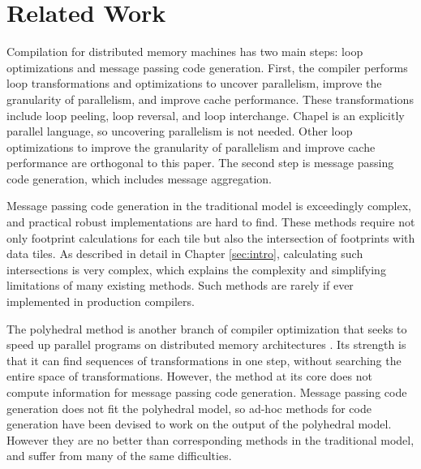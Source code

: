 
\renewcommand{\thechapter}{3}

\chapter{Related Work}\label{sec:relwork}


Compilation for distributed memory machines has two main steps: loop optimizations and message passing code generation. First, the compiler performs loop transformations and optimizations to uncover parallelism, improve the granularity of parallelism, and improve cache performance. These transformations include loop peeling, loop reversal, and loop interchange. Chapel is an explicitly parallel language, so uncovering parallelism is not needed. Other loop optimizations to improve the granularity of parallelism and improve cache performance are orthogonal to this paper. The second step is message passing code generation, which includes message aggregation.

Message passing code generation in the traditional model is exceedingly complex, and practical robust implementations are hard to find. These methods \cite{xue1997communication,goumas2006message,callahan1988compiling,ramanujam1991compile} require not only footprint calculations for each tile but also the intersection of footprints with data tiles. As described in detail in Chapter \ref{sec:intro}, calculating such intersections is very complex, which explains the complexity and simplifying limitations of many existing methods. Such methods are rarely if ever implemented in production compilers.

The polyhedral method is another branch of compiler optimization that seeks to speed up parallel programs on distributed memory architectures \cite{Gupta91automaticdata,chavarria2005effective,germain1995automatic, gupta1996compiling, iancu2008performance, wei1998compiling}. Its strength is that it can find sequences of transformations in one step, without searching the entire space of transformations. However, the method at its core does not compute information for message passing code generation. Message passing code generation does not fit the polyhedral model, so ad-hoc methods for code generation have been devised to work on the output of the polyhedral model. However they are no better than corresponding methods in the traditional model, and suffer from many of the same difficulties.

